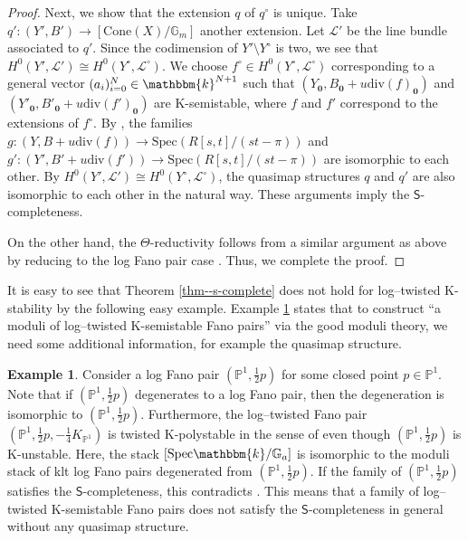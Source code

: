 \documentclass[12pt,twoside]{amsart}
\theoremstyle{definition}
\newtheorem{ex}[thm]{Example}
\begin{document}
\begin{proof}
    Next, we show that the extension $q$ of $q^\circ$ is unique. Take  $q'\colon(Y',B')\to[\mathrm{Cone}(X)/\mathbb{G}_m]$ another extension.
    Let $\mathscr{L}'$ be the line bundle associated to $q'$. Since the codimension of $Y'\setminus Y^\circ$ is two, we see that $H^0(Y',\mathscr{L}')\cong H^0(Y^\circ,\mathscr{L}^\circ)$.
   We choose $f^\circ\in H^0(Y^\circ,\mathscr{L}^\circ)$ corresponding to a general vector $(a_i)_{i=0}^{N}\in\mathbbm{k}^{N+1}$ such that $(Y_{\mathbf{0}},B_{\mathbf{0}}+u\mathrm{div}(f)_{\mathbf{0}})$ and $(Y'_{\mathbf{0}},B'_{\mathbf{0}}+u\mathrm{div}(f')_{\mathbf{0}})$ are K-semistable, where $f$ and $f'$ correspond to the extensions of $f^\circ$. 
    By \cite[Theorem 3.3]{ABHLX}, the families $g\colon(Y,B+u\mathrm{div}(f))\to \mathrm{Spec}(R[s,t]/(st-\pi))$ and $g'\colon(Y',B'+u\mathrm{div}(f'))\to \mathrm{Spec}(R[s,t]/(st-\pi))$ are isomorphic to each other.
    By $H^0(Y',\mathscr{L}')\cong H^0(Y^\circ,\mathscr{L}^\circ)$, the quasimap structures $q$ and $q'$ are also isomorphic to each other in the natural way.
    These arguments imply the $\mathsf{S}$-completeness.
    
On the other hand, the $\Theta$-reductivity follows from a similar argument as above by reducing to the log Fano pair case \cite[Theorem 5.2]{ABHLX}.
Thus, we complete the proof.
\end{proof}
It is easy to see that Theorem \ref{thm--s-complete} does not hold for log--twisted K-stability by the following easy example.
Example \ref{ex--S-compl--log--twisted} states that to construct ``a moduli of log--twisted K-semistable Fano pairs'' via the good moduli theory, we need some additional information, for example the quasimap structure.
\begin{ex}\label{ex--S-compl--log--twisted}
    Consider a log Fano pair $(\mathbb{P}^1,\frac{1}{2}p)$ for some closed point $p\in \mathbb{P}^1$.
    Note that if $(\mathbb{P}^1,\frac{1}{2}p)$ degenerates to a log Fano pair, then the degeneration is isomorphic to $(\mathbb{P}^1,\frac{1}{2}p)$.
    Furthermore, the log--twisted Fano pair $(\mathbb{P}^1,\frac{1}{2}p,-\frac{1}{4}K_{\mathbb{P}^1})$ is twisted K-polystable in the sense of \cite[Definition 3.2]{BLZ} even though $(\mathbb{P}^1,\frac{1}{2}p)$ is K-unstable. 
    Here, the stack $[\mathrm{Spec}\mathbbm{k}/\mathbb{G}_a]$ is isomorphic to the moduli stack of klt log Fano pairs degenerated from $(\mathbb{P}^1,\frac{1}{2}p)$.
    If the family of $(\mathbb{P}^1,\frac{1}{2}p)$ satisfies the $\mathsf{S}$-completeness, this contradicts \cite[Proposition 3.47]{AHLH}.
    This means that a family of log--twisted K-semistable Fano pairs does not satisfy the $\mathsf{S}$-completeness in general without any quasimap structure.
\end{ex}
\end{document}
